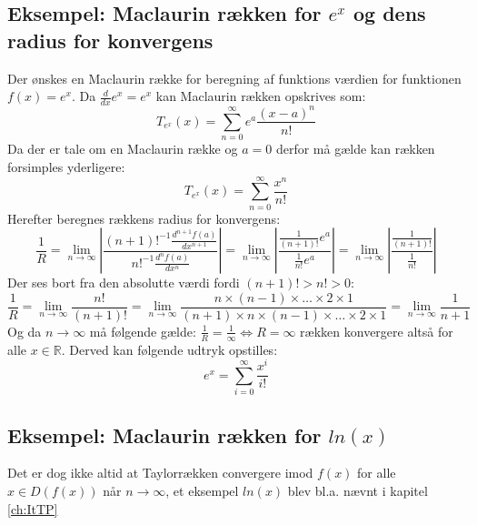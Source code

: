 
\subsection*{\textbf{Eksempel:} Maclaurin rækken for $e^x$ og dens radius for konvergens} 
Der ønskes en Maclaurin række for beregning af funktions værdien for funktionen $f(x) = e^x$.
Da $\frac{d}{dx}e^x = e^x$ kan Maclaurin rækken opskrives som:
\[
T_{e^x}(x) = \sum^\infty_{n = 0} e^a \frac{(x-a)^n}{n!}
\]
Da der er tale om en Maclaurin række og $a = 0$ derfor må gælde kan rækken forsimples yderligere:
\[
T_{e^x}(x) = \sum^\infty_{n = 0} \frac{x^n}{n!}  
\]
Herefter beregnes rækkens radius for konvergens:
\[
    \frac{1}{R} = \lim_{n \rightarrow \infty} \left\lvert \frac{(n + 1)!^{-1}\frac{d^{n+1} f(a)}{dx^{n+1}}}{n!^{-1}\frac{d^n f(a)}{dx^n}} \right\lvert
    = \lim_{n \rightarrow \infty} \left\lvert \frac{\frac{1}{(n + 1)!}e^a}{\frac{1}{n!}e^a} \right\lvert 
    = \lim_{n \rightarrow \infty} \left\lvert \frac{\frac{1}{(n + 1)!}}{\frac{1}{n!}} \right\lvert
\]
Der ses bort fra den absolutte værdi fordi $(n + 1)! > n! > 0$:
\[
    \frac{1}{R}= \lim_{n \rightarrow \infty} \frac{n!}{(n + 1)!} 
    = \lim_{n \rightarrow \infty} \frac{n \times (n-1) \times \ldots \times 2 \times 1}{(n + 1) \times n \times (n-1) \times \ldots \times 2 \times 1}
    = \lim_{n \rightarrow \infty} \frac{1}{n + 1}
\]
Og da $n \rightarrow \infty$ må følgende gælde: $\frac{1}{R} = \frac{1}{\infty} \Leftrightarrow R = \infty$ rækken konvergere altså for alle $x \in \mathbb{R}$.
Derved kan følgende udtryk opstilles:
\[
e^x = \sum^\infty_{i = 0} \frac{x^i}{i!}  
\]
\subsection*{\textbf{Eksempel:} Maclaurin rækken for $ln(x)$ } %
Det er dog ikke altid at Taylorrækken convergere imod $f(x)$ for alle $x \in D(f(x))$ når $n \rightarrow \infty$,
et eksempel $ln(x)$ blev bl.a. nævnt i kapitel \ref{ch:ItTP} 



